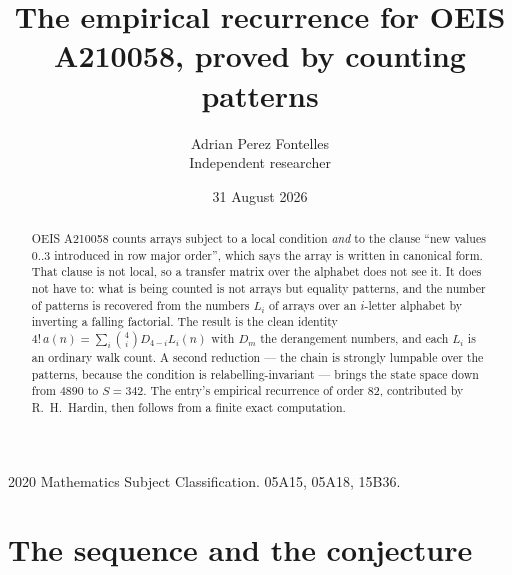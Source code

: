 \documentclass[11pt,a4paper]{article}
\title{The empirical recurrence for OEIS A210058, proved by counting patterns}
\author{Adrian Perez Fontelles\\ \small Independent researcher}
\date{31 August 2026}
\theoremstyle{plain}
\theoremstyle{definition}
\begin{document}
\maketitle

\begin{abstract}
OEIS A210058 counts arrays subject to a local condition \emph{and} to the clause ``new values
$0..3$ introduced in row major order'', which says the array is written in canonical
form. That clause is not local, so a transfer matrix over the alphabet does not see it. It
does not have to: what is being counted is not arrays but equality patterns, and the number
of patterns is recovered from the numbers $L_i$ of arrays over an $i$-letter alphabet by
inverting a falling factorial. The result is the clean identity
$4!\,a(n)=\sum_i\binom{4}{i}D_{4-i}L_i(n)$ with $D_m$ the derangement numbers,
and each $L_i$ is an ordinary walk count. A second reduction --- the chain is strongly
lumpable over the patterns, because the condition is relabelling-invariant --- brings the
state space down from $4890$ to $S=342$. The entry's empirical recurrence of order
$82$, contributed by R.~H.~Hardin, then follows from a finite exact computation.
\end{abstract}

\noindent\small 2020 Mathematics Subject Classification. 05A15, 05A18, 15B36.\normalsize

\section{The sequence and the conjecture}
\end{document}
